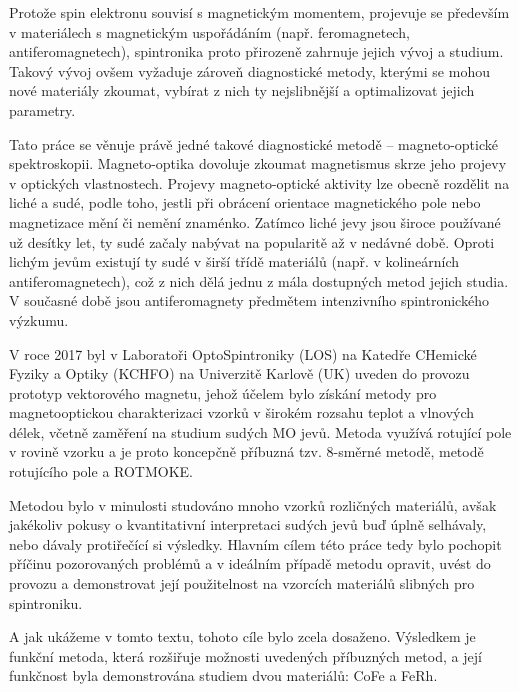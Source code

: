 Protože spin elektronu souvisí s magnetickým momentem, projevuje se především v materiálech s magnetickým uspořádáním (např. feromagnetech, antiferomagnetech), spintronika proto přirozeně zahrnuje jejich vývoj a studium.
Takový vývoj ovšem vyžaduje zároveň diagnostické metody, kterými se mohou nové materiály zkoumat, vybírat z nich ty nejslibnější a optimalizovat jejich parametry.

Tato práce se věnuje právě jedné takové diagnostické metodě -- magneto-optické spektroskopii.
Magneto-optika dovoluje zkoumat magnetismus skrze jeho projevy v optických vlastnostech.
Projevy magneto-optické aktivity lze obecně rozdělit na liché a sudé, podle toho, jestli při obrácení orientace magnetického pole nebo magnetizace mění či nemění znaménko.
Zatímco liché jevy jsou široce používané už desítky let, ty sudé začaly nabývat na popularitě až v nedávné době.
Oproti lichým jevům existují ty sudé v širší třídě materiálů (např. v kolineárních antiferomagnetech), což z nich dělá jednu z mála dostupných metod jejich studia.
V současné době jsou antiferomagnety předmětem intenzivního spintronického výzkumu.

V roce 2017 byl v Laboratoři OptoSpintroniky (LOS) na Katedře CHemické Fyziky a Optiky (KCHFO) na Univerzitě Karlově (UK) uveden do provozu prototyp vektorového magnetu, jehož účelem bylo získání metody pro magnetooptickou charakterizaci vzorků v širokém rozsahu teplot a vlnových délek, včetně zaměření na studium sudých MO jevů.
Metoda využívá rotující pole v rovině vzorku a je proto koncepčně příbuzná tzv. 8-směrné metodě, metodě rotujícího pole a ROTMOKE.

Metodou bylo v minulosti studováno mnoho vzorků rozličných materiálů, avšak jakékoliv pokusy o kvantitativní interpretaci sudých jevů buď úplně selhávaly, nebo dávaly protiřečící si výsledky.
Hlavním cílem této práce tedy bylo pochopit příčinu pozorovaných problémů a v ideálním případě metodu opravit, uvést do provozu a demonstrovat její použitelnost na vzorcích materiálů slibných pro spintroniku.

A jak ukážeme v tomto textu, tohoto cíle bylo zcela dosaženo.
Výsledkem je funkční metoda, která rozšiřuje možnosti uvedených příbuzných metod, a její funkčnost byla demonstrována studiem dvou materiálů: CoFe a FeRh.
